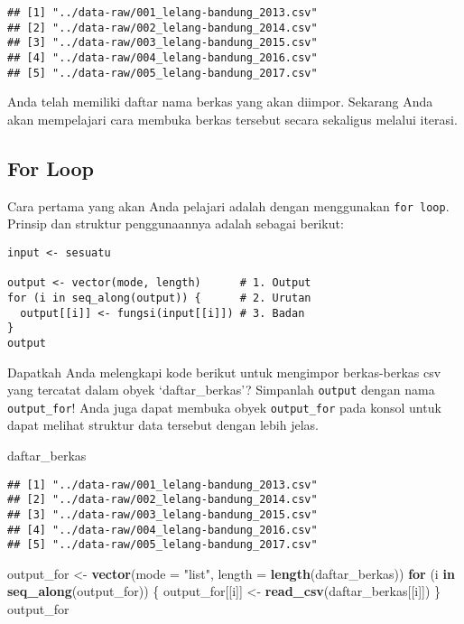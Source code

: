 \documentclass[]{article}
\newenvironment{Shaded}{\begin{snugshade}}{\end{snugshade}}
\newcommand{\ControlFlowTok}[1]{\textcolor[rgb]{0.13,0.29,0.53}{\textbf{#1}}}
\newcommand{\DataTypeTok}[1]{\textcolor[rgb]{0.13,0.29,0.53}{#1}}
\newcommand{\KeywordTok}[1]{\textcolor[rgb]{0.13,0.29,0.53}{\textbf{#1}}}
\newcommand{\NormalTok}[1]{#1}
\newcommand{\StringTok}[1]{\textcolor[rgb]{0.31,0.60,0.02}{#1}}
\begin{document}
\begin{verbatim}
## [1] "../data-raw/001_lelang-bandung_2013.csv"
## [2] "../data-raw/002_lelang-bandung_2014.csv"
## [3] "../data-raw/003_lelang-bandung_2015.csv"
## [4] "../data-raw/004_lelang-bandung_2016.csv"
## [5] "../data-raw/005_lelang-bandung_2017.csv"
\end{verbatim}

Anda telah memiliki daftar nama berkas yang akan diimpor. Sekarang Anda
akan mempelajari cara membuka berkas tersebut secara sekaligus melalui
iterasi.

\hypertarget{for-loop}{%
\subsection{For Loop}\label{for-loop}}

Cara pertama yang akan Anda pelajari adalah dengan menggunakan
\texttt{for\ loop}. Prinsip dan struktur penggunaannya adalah sebagai
berikut:

\begin{verbatim}
input <- sesuatu

output <- vector(mode, length)      # 1. Output
for (i in seq_along(output)) {      # 2. Urutan
  output[[i]] <- fungsi(input[[i]]) # 3. Badan
}
output
\end{verbatim}

Dapatkah Anda melengkapi kode berikut untuk mengimpor berkas-berkas csv
yang tercatat dalam obyek `daftar\_berkas'? Simpanlah \texttt{output}
dengan nama \texttt{output\_for}! Anda juga dapat membuka obyek
\texttt{output\_for} pada konsol untuk dapat melihat struktur data
tersebut dengan lebih jelas.

\begin{Shaded}
\begin{Highlighting}[]
\NormalTok{daftar_berkas}
\end{Highlighting}
\end{Shaded}

\begin{verbatim}
## [1] "../data-raw/001_lelang-bandung_2013.csv"
## [2] "../data-raw/002_lelang-bandung_2014.csv"
## [3] "../data-raw/003_lelang-bandung_2015.csv"
## [4] "../data-raw/004_lelang-bandung_2016.csv"
## [5] "../data-raw/005_lelang-bandung_2017.csv"
\end{verbatim}

\begin{Shaded}
\begin{Highlighting}[]
\NormalTok{output_for <-}\StringTok{ }\KeywordTok{vector}\NormalTok{(}\DataTypeTok{mode =} \StringTok{"list"}\NormalTok{, }\DataTypeTok{length =} \KeywordTok{length}\NormalTok{(daftar_berkas))}
\ControlFlowTok{for}\NormalTok{ (i }\ControlFlowTok{in} \KeywordTok{seq_along}\NormalTok{(output_for)) \{}
\NormalTok{  output_for[[i]] <-}\StringTok{ }\KeywordTok{read_csv}\NormalTok{(daftar_berkas[[i]])}
\NormalTok{\}}
\NormalTok{output_for}
\end{Highlighting}
\end{Shaded}
\end{document}
